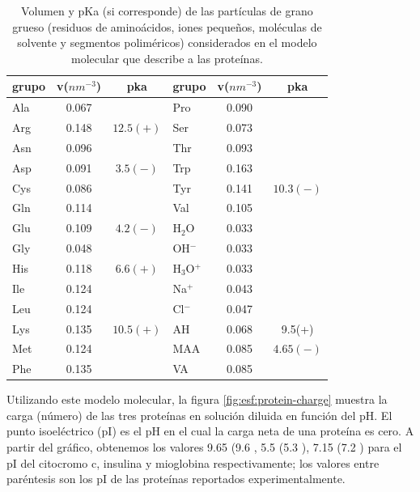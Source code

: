 \begin{table}
\centering
\small
\begin{tabular}{|lcc|lcc|}
\hline
grupo & v($nm^{-3}$) & pka & grupo & v($nm^{-3}$) & pka \\
\hline
Ala & 0.067 &  & Pro & 0.090 & \\
Arg & 0.148 & $12.5 (+)$& Ser & 0.073 &\\
Asn & 0.096 &  & Thr & 0.093 & \\
Asp & 0.091 & $3.5 (-)$ & Trp & 0.163 &\\
Cys & 0.086 &  & Tyr & 0.141 & $10.3 (-)$\\
Gln & 0.114 & & Val & 0.105 &\\  
Glu & 0.109 & $4.2 (-)$ & H$_2$O & 0.033 & \\ 
Gly & 0.048 &  & OH$^-$ & 0.033 & \\
His & 0.118 & $6.6 (+)$& H$_3$O$^+$ & 0.033 &  \\ 
Ile & 0.124 &  & Na$^+$ & 0.043 & \\ %
Leu & 0.124 &  & Cl$^-$ & 0.047 & \\
Lys & 0.135 & $10.5 (+)$ & AH & 0.068 &  9.5(+)\\
Met & 0.124 & & MAA & 0.085 & $4.65(-)$\\
Phe & 0.135 &   & VA & 0.085 & \\
\hline
\end{tabular}
\caption{Volumen y pKa (si corresponde) de las part\'iculas de grano grueso (residuos de amino\'acidos, iones peque\~nos, mol\'eculas de solvente y segmentos polim\'ericos) considerados en el modelo molecular que describe a las prote\'inas.}
\label{table:Coarse-grain} 
\end{table}


Utilizando este modelo molecular, la figura \ref{fig:esf:protein-charge} muestra la carga (n\'umero) de las tres prote\'inas en soluci\'on diluida en funci\'on del pH.
El punto isoel\'ectrico (pI) es el pH en el cual la carga neta de una prote\'ina es cero.
A partir del gr\'afico, obtenemos los valores 9.65 (9.6 \cite{hristova2019isoelectric}, 5.5 (5.3 \cite{guckeisen2019isoelectric}), 7.15 (7.2 \cite{batys2020myoglobin}) para el pI del citocromo c, insulina y mioglobina respectivamente;
los valores entre par\'entesis son los pI de las prote\'inas reportados experimentalmente.


